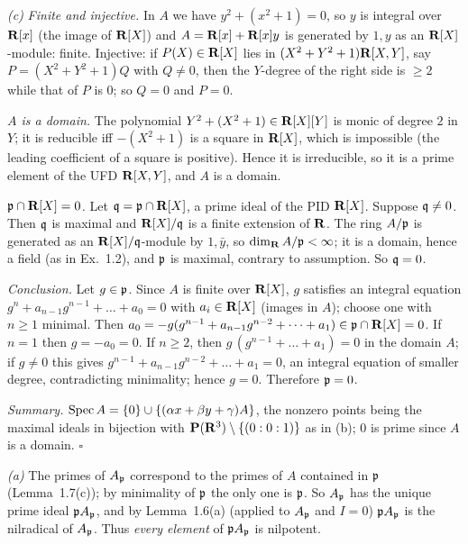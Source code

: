 \documentclass[11pt]{article}
\begin{document}
\emph{(c)} \emph{Finite and injective.} In $A$ we have $y^2+(x^2+1)=0$, so $y$ is integral over $\mathbf R[x]$ (the image of $\mathbf R[X]$) and $A=\mathbf R[x]+\mathbf R[x]y$ is generated by $1,y$ as an $\mathbf R[X]$-module: finite. Injective: if $P(X)\in\mathbf R[X]$ lies in $(X^2+Y^2+1)\mathbf R[X,Y]$, say $P=(X^2+Y^2+1)Q$ with $Q\neq0$, then the $Y$-degree of the right side is $\ge2$ while that of $P$ is $0$; so $Q=0$ and $P=0$.

\emph{$A$ is a domain.} The polynomial $Y^2+(X^2+1)\in\mathbf R[X][Y]$ is monic of degree $2$ in $Y$; it is reducible iff $-(X^2+1)$ is a square in $\mathbf R[X]$, which is impossible (the leading coefficient of a square is positive). Hence it is irreducible, so it is a prime element of the UFD $\mathbf R[X,Y]$, and $A$ is a domain.

\emph{$\mathfrak p\cap\mathbf R[X]=0$.} Let $\mathfrak q=\mathfrak p\cap\mathbf R[X]$, a prime ideal of the PID $\mathbf R[X]$. Suppose $\mathfrak q\neq0$. Then $\mathfrak q$ is maximal and $\mathbf R[X]/\mathfrak q$ is a finite extension of $\mathbf R$. The ring $A/\mathfrak p$ is generated as an $\mathbf R[X]/\mathfrak q$-module by $1,\bar y$, so $\dim_\mathbf R A/\mathfrak p<\infty$; it is a domain, hence a field (as in Ex.~1.2), and $\mathfrak p$ is maximal, contrary to assumption. So $\mathfrak q=0$.

\emph{Conclusion.} Let $g\in\mathfrak p$. Since $A$ is finite over $\mathbf R[X]$, $g$ satisfies an integral equation $g^n+a_{n-1}g^{n-1}+\dots+a_0=0$ with $a_i\in\mathbf R[X]$ (images in $A$); choose one with $n\ge1$ minimal. Then $a_0=-g(g^{n-1}+a_{n-1}g^{n-2}+\dots+a_1)\in\mathfrak p\cap\mathbf R[X]=0$. If $n=1$ then $g=-a_0=0$. If $n\ge2$, then $g\,(g^{n-1}+\dots+a_1)=0$ in the domain $A$; if $g\neq0$ this gives $g^{n-1}+a_{n-1}g^{n-2}+\dots+a_1=0$, an integral equation of smaller degree, contradicting minimality; hence $g=0$. Therefore $\mathfrak p=0$.

\emph{Summary.} $\operatorname{Spec} A=\{0\}\cup\{(\alpha x+\beta y+\gamma)A\}$, the nonzero points being the maximal ideals in bijection with $\mathbf P(\mathbf R^3)\setminus\{(0:0:1)\}$ as in (b); $0$ is prime since $A$ is a domain. \hfill$\square$

\pf
\emph{(a)} The primes of $A_\mathfrak p$ correspond to the primes of $A$ contained in $\mathfrak p$ (Lemma~1.7(c)); by minimality of $\mathfrak p$ the only one is $\mathfrak p$. So $A_\mathfrak p$ has the unique prime ideal $\mathfrak p A_\mathfrak p$, and by Lemma~1.6(a) (applied to $A_\mathfrak p$ and $I=0$) $\mathfrak p A_\mathfrak p$ is the nilradical of $A_\mathfrak p$. Thus \emph{every element} of $\mathfrak p A_\mathfrak p$ is nilpotent.
\end{document}
